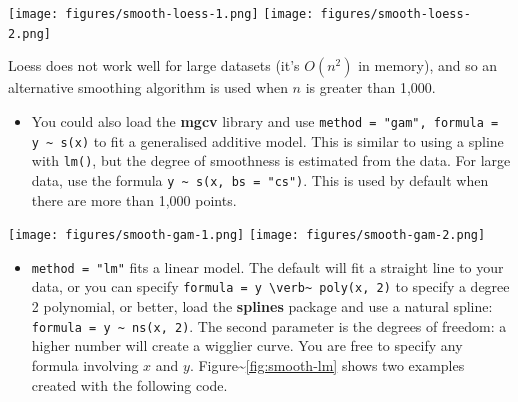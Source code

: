 \texttt{[image: figures/smooth-loess-1.png]}
\texttt{[image: figures/smooth-loess-2.png]}

\noindent Loess does not work well for large datasets (it's \(O(n^2)\)
in memory), and so an alternative smoothing algorithm is used when \(n\)
is greater than 1,000.

\begin{itemize}
\itemsep1pt\parskip0pt
\item
  You could also load the \textbf{mgcv} library and use
  \texttt{method = "gam", formula = y \textasciitilde{} s(x)} to fit a
  generalised additive model. This is similar to using a spline with
  \texttt{lm()}, but the degree of smoothness is estimated from the
  data. For large data, use the formula
  \texttt{y \textasciitilde{} s(x, bs = "cs")}. This is used by default
  when there are more than 1,000 points. 
\end{itemize}

\begin{Shaded}
\begin{Highlighting}[]
  \NormalTok{(}\NormalTok{, }\NormalTok{), }
   \NormalTok{, } \StringTok{ }
  \NormalTok{(}\NormalTok{, }\NormalTok{), }
   \NormalTok{, } \StringTok{ } \NormalTok{))}
\end{Highlighting}
\end{Shaded}

\texttt{[image: figures/smooth-gam-1.png]}
\texttt{[image: figures/smooth-gam-2.png]}

\begin{itemize}
\itemsep1pt\parskip0pt
\item
  \texttt{method = "lm"} fits a linear model. The default will fit a
  straight line to your data, or you can specify
  \texttt{formula = y \textbackslash{}verb\textbar{}\textasciitilde{}\textbar{} poly(x, 2)}
  to specify a degree 2 polynomial, or better, load the \textbf{splines}
  package and use a natural spline:
  \texttt{formula = y \textasciitilde{} ns(x, 2)}. The second parameter
  is the degrees of freedom: a higher number will create a wigglier
  curve. You are free to specify any formula involving \(x\) and \(y\).
  Figure\textasciitilde{}\ref{fig:smooth-lm} shows two examples created
  with the following code. 
\end{itemize}

